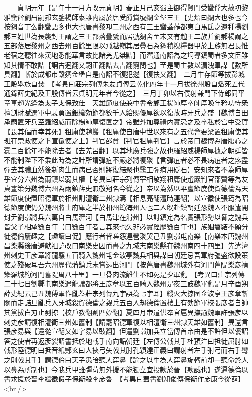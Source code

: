 　　貞明元年【是年十一月方改元貞明】春正月己亥蜀主御得賢門受蠻俘大赦初黎雅蠻酋劉昌嗣郝玄鑒楊師泰雖内屬於唐受爵賞號㚋金堡三王【史炤曰㚋大也多也今按㚋音丁么翻蠻語多也大也唐書黎卭二州之西有三王蠻蓋莋都夷白馬氐之遺種楊劉郝三姓世為長襲封王謂之三王部落疊甓而居號㚋舍至宋又有趙王二族并劉郝楊謂之五部落居黎州之西去州百餘里限以飛越嶺其居疊石為㚋積糗糧器甲於上族無君長惟老宿之聽往來漢地悉能華言故比諸羌尤桀黠】而濳通南詔為之詗導鎮蜀者多文臣雖知其情不敢詰【詗古迥翻又翾正翻詰去吉翻窮問也】至是蜀主數以漏洩軍謀【數所具翻】斬於成都市毁㚋金堡自是南詔不復犯邊【復扶又翻】　二月牛存節等拔彭城王殷舉族自焚　【考異曰莊宗列傳朱友貞傳云乾化四年十一月拔徐州殷自燔死五代通錄薛史紀及王殷傳皆云貞明元年者今從之】　三月丁卯以右僕射兼門下侍郎同平章事趙光逢為太子太保致仕　天雄節度使兼中書令鄴王楊師厚卒師厚晚年矜功恃衆擅割財賦選軍中驍勇置銀槍効節都數千人給賜優厚欲以復故時牙兵之盛【魏博自田承嗣置牙兵至羅紹威而除楊師厚復置之】帝雖外加尊禮内實忌之及卒私於宫中受賀【畏其偪而幸其死】租庸使趙巖【租庸使自唐中世以來有之五代會要梁置租庸使其班在崇政使之下宣徽使之上】判官邵贊【判官租庸判官】言於帝曰魏博為唐腹心之蠧二百餘年不能除去者【去羌呂翻】以其地廣兵強之故也羅紹威楊師厚據之朝廷皆不能制陛下不乘此時為之計所謂彈疽不嚴必將復聚【言彈疽者必不畏病疽者之疼盡彈去其膿血然後新肉生而病已否則將復結聚也醫工彈疽用砭石】安知來者不為師厚乎宜分六州為兩鎮以弱其權【考異曰莊宗列傳宰相敬翔租庸使趙巖判官邵贊等為友貞畫策分魏博六州為兩鎮薛史無敬翔名今從之】帝以為然以平盧節度使賀德倫為天雄節度使置昭德軍於相州割澶衛二州隸焉【相息亮翻澶時連翻】以宣徽使張筠為昭德節度使仍分魏州將士府庫之半於相州筠海州人也二人旣赴鎮朝廷恐魏人不服遣開封尹劉鄩將兵六萬自白馬濟河【白馬津在滑州】以討鎮定為名實張形勢以脅之魏兵皆父子相承數百年【曰數百年者言其來也久非必實經歷數百年也】族姻磐結不願分徙德倫屢趣之【趣讀曰促】應行者皆嗟怨連營聚哭己丑劉鄩屯南樂【南樂本唐魏州昌樂縣後唐避獻祖諱改曰南樂史因而書之九域志南樂縣在魏州南四十四里】先遣澶州刺史王彦章將龍驤五百騎入魏州屯金波亭魏兵相與謀曰朝廷忌吾軍府彊盛欲設策使之殘破耳吾六州歷代藩鎮兵未嘗遠出河門【按舊唐書魏州城外有河門舊隄樂彦禎築羅城約河門舊隄周八十里】一旦骨肉流離生不如死是夕軍亂　【考異曰莊宗列傳二十七日劉鄩屯南樂遣龍驤都將王彦章以五百騎入魏州是夜三鼓魏軍亂是月辛酉朔薛史紀云己丑魏傅軍作亂蓋莊宗列傳九字誤為七字耳】縱火大掠圍金波亭王彦章斬關而走詰旦亂兵入牙城殺賀德倫之親兵五百人刼德倫置樓上有効節軍校張彦者自帥其黨拔白刃止剽掠【校戶教翻剽匹妙翻】夏四月帝遣供奉官扈異撫諭魏軍許張彦以刺史彦請復相澶衛三州如舊制【請罷昭德軍復以相澶衛三州隸天雄如舊制】異還言張彦易與【還從宣翻又如字易以䜴翻】但遣劉鄩加兵立當傳首帝由是不許但以優詔答之使者再返彥裂詔書抵於地戟手南向詬朝廷【左傳公戟其手杜預注曰抵徙屈肘如戟形陸德明曰抵音紙鄭玄曰人挾弓矢戟其肘孔穎達正義曰謂射者左手弣弓而右手彎之則戟其手】謂德倫曰天子愚暗聽人穿鼻【諭之以牛為人穿鼻旋轉前却一聽命於人以鼻為所制也】今我兵甲雖彊苟無外援不能獨立宜投款於晉【款誠也】遂逼德倫以書求援於晉李繼徽假子保衡殺李彦魯　【考異曰蜀書劉知俊傳保衡作彦康今從薛】<br />
